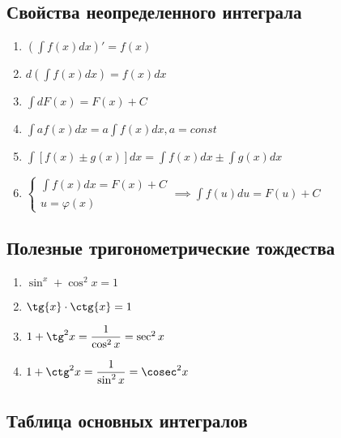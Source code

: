 \documentclass[a4paper,12pt,oneside]{extbook}
\theoremstyle{numbered}
\theoremstyle{unnumbered}
\theoremstyle{named}
\theoremstyle{unnumbered}
\theoremstyle{named}
\theoremstyle{named}
\theoremstyle{named}
\begin{document}
\subsection{Свойства неопределенного интеграла}%
\label{sub:Свойства неопределенного интеграла}
\begin{enumerate}
    \item {\((\int f(x) dx)' = f(x)\)}
    \item {\(d(\int f(x) dx) = f(x)dx\)}
    \item {\(\int d F(x) = F(x) + C\)}
    \item {\(\int a f(x) dx = a \int f(x) dx, a = const\)}
    \item {\(\int [f(x) \pm g(x)]dx = \int f(x)dx \pm \int g(x)dx\)}
    \item {
          \(
          \begin{cases}
              \int f(x) dx = F(x) + C \\
              u = \varphi(x)
          \end{cases}
          \implies
          \int f(u) du = F(u) + C
          \)
          }
\end{enumerate}

\subsection{Полезные тригонометрические тождества}%
\label{ssub:Тригонометрические тождества}

\begin{multicols}{2}
    \begin{enumerate}
        \item {\(\sin^{x} + \cos^2{x} = 1\)}
        \item {\(\tg{x} \cdot \ctg{x} = 1\)}
        \item {\(1 + \tg^2{x} = \dfrac{1}{\cos^2{x}} = \sec^2{x}\)}
        \item {\(1 + \ctg^2{x} = \dfrac{1}{\sin^2{x}} = \cosec^2{x}\)}
    \end{enumerate}
\end{multicols}

\subsection{Таблица основных интегралов}%
\label{sub:Таблица основных интегралов}
\end{document}
